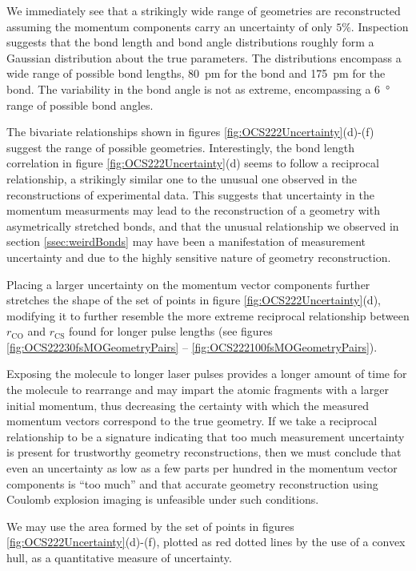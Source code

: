 We immediately see that a strikingly wide range of geometries are reconstructed assuming the momentum components carry an uncertainty of only $5\%$. Inspection suggests that the bond length and bond angle distributions roughly form a Gaussian distribution about the true parameters. The distributions encompass a wide range of possible bond lengths, \SI{80}{\pico\m} for the  bond and \SI{175}{\pico\m} for the  bond. The variability in the bond angle is not as extreme, encompassing a \SI{6}{\degree} range of possible bond angles.

The bivariate relationships shown in figures \ref{fig:OCS222Uncertainty}(d)-(f) suggest the range of possible geometries. Interestingly, the bond length correlation in figure \ref{fig:OCS222Uncertainty}(d) seems to follow a reciprocal relationship, a strikingly similar one to the unusual one observed in the reconstructions of experimental data. This suggests that uncertainty in the momentum measurments may lead to the reconstruction of a geometry with asymetrically stretched bonds, and that the unusual relationship we observed in section \ref{ssec:weirdBonds} may have been a manifestation of measurement uncertainty and due to the highly sensitive nature of geometry reconstruction.

Placing a larger uncertainty on the momentum vector components further stretches the shape of the set of points in figure \ref{fig:OCS222Uncertainty}(d), modifying it to further resemble the more extreme reciprocal relationship between $r_\mathrm{CO}$ and $r_\mathrm{CS}$ found for longer pulse lengths (see figures \ref{fig:OCS22230fsMOGeometryPairs} -- \ref{fig:OCS222100fsMOGeometryPairs}). 

Exposing the molecule to longer laser pulses provides a longer amount of time for the molecule to rearrange and may impart the atomic fragments with a larger initial momentum, thus decreasing the certainty with which the measured momentum vectors correspond to the true geometry. If we take a reciprocal relationship to be a signature indicating that too much measurement uncertainty is present for trustworthy geometry reconstructions, then we must conclude that even an uncertainty as low as a few parts per hundred in the momentum vector components is ``too much'' and that accurate geometry reconstruction using Coulomb explosion imaging is unfeasible under such conditions.

We may use the area formed by the set of points in figures \ref{fig:OCS222Uncertainty}(d)-(f), plotted as red dotted lines by the use of a convex hull, as a quantitative measure of uncertainty.

